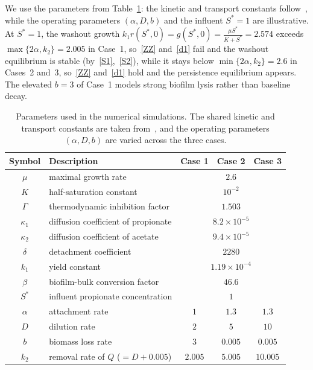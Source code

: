 \documentclass[reqno,11pt]{amsart}
\numberwithin{equation}{section}
\begin{document}
\begin{appendix}
We use the parameters from Table~\ref{tab:sim}: the kinetic and transport constants follow~\cite{GHE21}, while the operating parameters $(\alpha,D,b)$ and the influent $S^*=1$ are illustrative. At $S^*=1$, the washout growth $
k_1r(S^*,0)=g(S^*,0)=\frac{\mu S^*}{K+S^*}=2.574$
exceeds $\max\{2\alpha,k_2\}=2.005$ in Case~1, so~\eqref{ZZ} and~\eqref{d1} fail and the washout equilibrium is stable (by~\eqref{S1},~\eqref{S2}), while it stays below $\min\{2\alpha,k_2\}=2.6$ in Cases~2 and~3, so~\eqref{ZZ} and~\eqref{d1} hold and the persistence equilibrium appears. The elevated $b=3$ of Case~1 models strong biofilm lysis rather than baseline decay.

\begin{table}[h]
\centering
\small
\setlength{\tabcolsep}{5pt}
\renewcommand{\arraystretch}{1.3}
%
\begin{tabular}{clccc}
\hline
\textbf{Symbol} & \textbf{Description} & \textbf{Case 1} & \textbf{Case 2} & \textbf{Case 3}\\ \hline
$\mu$ & maximal growth rate & \multicolumn{3}{c}{$2.6$}\\
$K$ & half-saturation constant & \multicolumn{3}{c}{$10^{-2}$}\\
$\Gamma$ & thermodynamic inhibition factor & \multicolumn{3}{c}{$1.503$}\\
$\kappa_1$ & diffusion coefficient of propionate & \multicolumn{3}{c}{$8.2\times10^{-5}$}\\
$\kappa_2$ & diffusion coefficient of acetate & \multicolumn{3}{c}{$9.4\times10^{-5}$}\\
$\delta$ & detachment coefficient & \multicolumn{3}{c}{$2280$}\\
$k_1$ & yield constant & \multicolumn{3}{c}{$1.19\times10^{-4}$}\\
$\beta$ & biofilm-bulk conversion factor & \multicolumn{3}{c}{$46.6$}\\
$S^*$ & influent propionate concentration & \multicolumn{3}{c}{$1$}\\ \hline
$\alpha$ & attachment rate & $1$ & $1.3$ & $1.3$\\
$D$ & dilution rate & $2$ & $5$ & $10$\\
$b$ & biomass loss rate & $3$ & $0.005$ & $0.005$\\
$k_2$ & removal rate of $Q$ ($=D+0.005$) & $2.005$ & $5.005$ & $10.005$\\ \hline
\end{tabular}
\vspace{0.2cm}
\caption{Parameters used in the numerical simulations. The shared kinetic and transport constants are taken from~\cite{GHE21}, and the operating parameters $(\alpha,D,b)$ are varied across the three cases.}\label{tab:sim}
\end{table}


\end{appendix}
\end{document}
